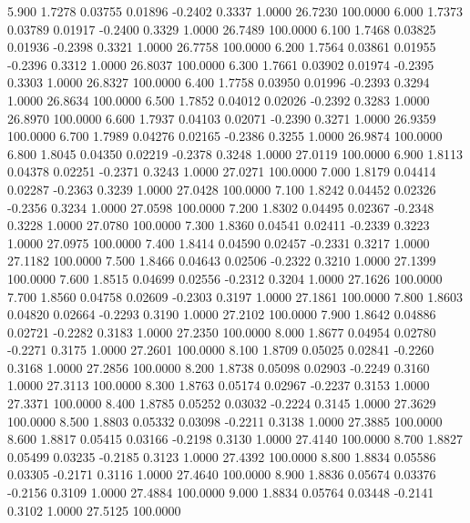    5.900   1.7278   0.03755   0.01896  -0.2402   0.3337   1.0000  26.7230 100.0000
   6.000   1.7373   0.03789   0.01917  -0.2400   0.3329   1.0000  26.7489 100.0000
   6.100   1.7468   0.03825   0.01936  -0.2398   0.3321   1.0000  26.7758 100.0000
   6.200   1.7564   0.03861   0.01955  -0.2396   0.3312   1.0000  26.8037 100.0000
   6.300   1.7661   0.03902   0.01974  -0.2395   0.3303   1.0000  26.8327 100.0000
   6.400   1.7758   0.03950   0.01996  -0.2393   0.3294   1.0000  26.8634 100.0000
   6.500   1.7852   0.04012   0.02026  -0.2392   0.3283   1.0000  26.8970 100.0000
   6.600   1.7937   0.04103   0.02071  -0.2390   0.3271   1.0000  26.9359 100.0000
   6.700   1.7989   0.04276   0.02165  -0.2386   0.3255   1.0000  26.9874 100.0000
   6.800   1.8045   0.04350   0.02219  -0.2378   0.3248   1.0000  27.0119 100.0000
   6.900   1.8113   0.04378   0.02251  -0.2371   0.3243   1.0000  27.0271 100.0000
   7.000   1.8179   0.04414   0.02287  -0.2363   0.3239   1.0000  27.0428 100.0000
   7.100   1.8242   0.04452   0.02326  -0.2356   0.3234   1.0000  27.0598 100.0000
   7.200   1.8302   0.04495   0.02367  -0.2348   0.3228   1.0000  27.0780 100.0000
   7.300   1.8360   0.04541   0.02411  -0.2339   0.3223   1.0000  27.0975 100.0000
   7.400   1.8414   0.04590   0.02457  -0.2331   0.3217   1.0000  27.1182 100.0000
   7.500   1.8466   0.04643   0.02506  -0.2322   0.3210   1.0000  27.1399 100.0000
   7.600   1.8515   0.04699   0.02556  -0.2312   0.3204   1.0000  27.1626 100.0000
   7.700   1.8560   0.04758   0.02609  -0.2303   0.3197   1.0000  27.1861 100.0000
   7.800   1.8603   0.04820   0.02664  -0.2293   0.3190   1.0000  27.2102 100.0000
   7.900   1.8642   0.04886   0.02721  -0.2282   0.3183   1.0000  27.2350 100.0000
   8.000   1.8677   0.04954   0.02780  -0.2271   0.3175   1.0000  27.2601 100.0000
   8.100   1.8709   0.05025   0.02841  -0.2260   0.3168   1.0000  27.2856 100.0000
   8.200   1.8738   0.05098   0.02903  -0.2249   0.3160   1.0000  27.3113 100.0000
   8.300   1.8763   0.05174   0.02967  -0.2237   0.3153   1.0000  27.3371 100.0000
   8.400   1.8785   0.05252   0.03032  -0.2224   0.3145   1.0000  27.3629 100.0000
   8.500   1.8803   0.05332   0.03098  -0.2211   0.3138   1.0000  27.3885 100.0000
   8.600   1.8817   0.05415   0.03166  -0.2198   0.3130   1.0000  27.4140 100.0000
   8.700   1.8827   0.05499   0.03235  -0.2185   0.3123   1.0000  27.4392 100.0000
   8.800   1.8834   0.05586   0.03305  -0.2171   0.3116   1.0000  27.4640 100.0000
   8.900   1.8836   0.05674   0.03376  -0.2156   0.3109   1.0000  27.4884 100.0000
   9.000   1.8834   0.05764   0.03448  -0.2141   0.3102   1.0000  27.5125 100.0000
